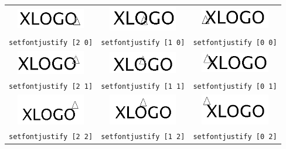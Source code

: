 \begin{center}
 \begin{tabular}{|c|c|c|}
 \hline
\includegraphics[width=3cm]{pics/fap20.png} & \includegraphics[width=3cm]{pics/fap10.png} & \includegraphics[width=3cm]{pics/fap00.png} \\
\texttt{setfontjustify [2 0]} & \texttt{setfontjustify [1 0]} & \texttt{setfontjustify [0 0]}\\
 \hline
\includegraphics[width=3cm]{pics/fap21.png}& \includegraphics[width=3cm]{pics/fap11.png} & \includegraphics[width=3cm]{pics/fap01.png} \\
\texttt{setfontjustify [2 1]} & \texttt{setfontjustify [1 1]} & \texttt{setfontjustify [0 1]}\\
 \hline
\includegraphics[width=3cm]{pics/fap22.png}& \includegraphics[width=3cm]{pics/fap12.png} & \includegraphics[width=3cm]{pics/fap02.png} \\
\texttt{setfontjustify [2 2]} & \texttt{setfontjustify [1 2]} & \texttt{setfontjustify [0 2]}\\
 \hline
\end{tabular}
\end{center}
